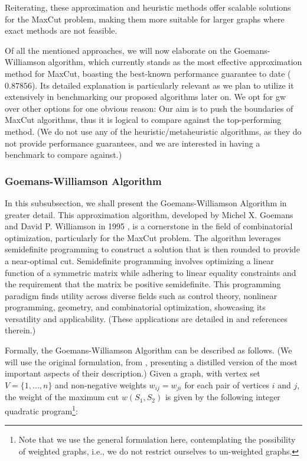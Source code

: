 Reiterating, these approximation and heuristic methods offer scalable solutions for the MaxCut problem, making them more suitable for larger graphs where exact methods are not feasible.

Of all the mentioned approaches, we will now elaborate on the Goemans-Williamson algorithm, which currently stands as the most effective approximation method for MaxCut, boasting the best-known performance guarantee to date ($0.87856$). Its detailed explanation is particularly relevant as we plan to utilize it extensively in benchmarking our proposed algorithms later on. We opt for \acrshort{gw} over other options for one obvious reason: Our aim is to push the boundaries of MaxCut algorithms, thus it is logical to compare against the top-performing method. (We do not use any of the heuristic/metaheuristic algorithms, as they do not provide performance guarantees, and we are interested in having a benchmark to compare against.)

\subsubsection{Goemans-Williamson Algorithm}
\label{subsubsection:GW_Algorithm}

In this subsubsection, we shall present the Goemans-Williamson Algorithm in greater detail. This approximation algorithm, developed by Michel X. Goemans and David P. Williamson in 1995 \cite{GW-Algorithm}, is a cornerstone in the field of combinatorial optimization, particularly for the MaxCut problem. The algorithm leverages semidefinite programming to construct a solution that is then rounded to provide a near-optimal cut. Semidefinite programming involves optimizing a linear function of a symmetric matrix while adhering to linear equality constraints and the requirement that the matrix be positive semidefinite. This programming paradigm finds utility across diverse fields such as control theory, nonlinear programming, geometry, and combinatorial optimization, showcasing its versatility and applicability. (These applications are detailed in \cite{GW-Algorithm} and references therein.)

Formally, the Goemans-Williamson Algorithm can be described as follows. (We will use the original formulation, from \cite{GW-Algorithm}, presenting a distilled version of the most important aspects of their description.) Given a graph, with vertex set $V = \{1,..., n\}$ and non-negative weights $w_{ij} = w_{ji}$ for each pair of vertices $i$ and $j$, the weight of the maximum cut $w(S_1, S_2)$ is given by the following integer quadratic program\footnote{Note that we use the general formulation here, contemplating the possibility of weighted graphs, i.e., we do not restrict ourselves to un-weighted graphs.}:

